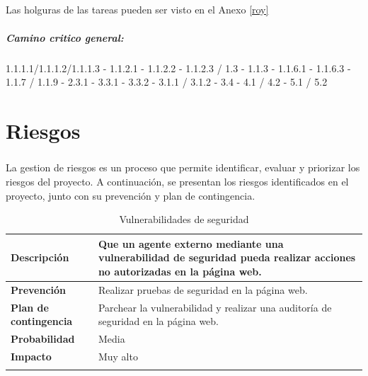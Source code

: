 \documentclass{report}
\begin{document}
        \paragraph*{}{
            Las holguras de las tareas pueden ser visto en el Anexo \ref{roy}
        }
        \paragraph*{Camino critico general: }{1.1.1.1/1.1.1.2/1.1.1.3 - 1.1.2.1 - 1.1.2.2 - 1.1.2.3 / 1.3 - 1.1.3 - 1.1.6.1 - 1.1.6.3 - 1.1.7 / 1.1.9 - 2.3.1 - 3.3.1 - 3.3.2 - 3.1.1 / 3.1.2 - 3.4 - 4.1 / 4.2 - 5.1 / 5.2}
    \chapter{Riesgos}
        \paragraph*{}{
            La gestion de riesgos es un proceso que permite identificar, evaluar y priorizar los riesgos del proyecto. A continuación, se presentan los riesgos identificados en el proyecto, junto con su prevención y plan de contingencia.
        }
        \begin{center}
            \begin{longtable}{|p{6cm}|p{6cm}|}
                \hline
                \textbf{Descripción} & Que un agente externo mediante una vulnerabilidad de seguridad pueda realizar acciones no autorizadas en la página web.\\
                \hline
                \textbf{Prevención} & Realizar pruebas de seguridad en la página web.\\
                \hline
                \textbf{Plan de contingencia} & Parchear la vulnerabilidad y realizar una auditoría de seguridad en la página web.\\
                \hline
                \textbf{Probabilidad} & Media\\
                \hline
                \textbf{Impacto} & Muy alto\\
                \hline
                \caption{Vulnerabilidades de seguridad}
            \end{longtable}
        \end{center}
\end{document}
